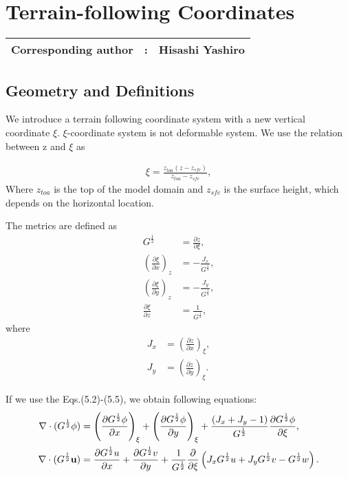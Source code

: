 \chapter{Terrain-following Coordinates}
\label{chap:terrain-following}
{\bf \Large 
\begin{tabular}{ccc}
\hline
  Corresponding author & : & Hisashi Yashiro\\
\hline
\end{tabular}
}

\section{Geometry and Definitions}
We introduce a terrain following coordinate system with a new vertical coordinate $\xi$. 
$\xi$-coordinate system is not deformable system. We use the relation between z and $\xi$ as

\begin{eqnarray}
 \xi = \frac{z_{toa}(z-z_{sfc})}{z_{toa}-z_{sfc}},
\end{eqnarray}
Where $z_{toa}$ is the top of the model domain and $z_{sfc}$ is the surface height, 
which depends on the horizontal location.

The metrics are defined as
\begin{align}
 G^{\frac{1}{2}} &= \frac{\partial z}{\partial \xi}, \\
 \left(\frac{\partial \xi}{\partial x}\right)_{z} &= -\frac{J_{x}}{G^{\frac{1}{2}}},\\
 \left(\frac{\partial \xi}{\partial y}\right)_{z} &= -\frac{J_{y}}{G^{\frac{1}{2}}},\\
       \frac{\partial \xi}{\partial z}            &=  \frac{1}{G^{\frac{1}{2}}},
\end{align}
where
\begin{align}
 J_{x} &= \left(\frac{\partial z}{\partial x}\right)_{\xi},\\
 J_{y} &= \left(\frac{\partial z}{\partial y}\right)_{\xi}.
\end{align}

If we use the Eqs.(5.2)-(5.5), we obtain following equations:
\begin{align}
 \nabla \cdot (G^{\frac{1}{2}} \phi) &= \left(\frac{\partial G^{\frac{1}{2}} \phi}{\partial x}\right)_{\xi}
                                      + \left(\frac{\partial G^{\frac{1}{2}} \phi}{\partial y}\right)_{\xi}
                                      + \frac{(J_{x}+J_{y}-1)}{G^{\frac{1}{2}}} \frac{\partial G^{\frac{1}{2}} \phi}{\partial \xi}, \\
 \nabla \cdot (G^{\frac{1}{2}} \bf u) &= \frac{\partial G^{\frac{1}{2}} u}{\partial x}
                                       + \frac{\partial G^{\frac{1}{2}} v}{\partial y}
                                       + \frac{1}{G^{\frac{1}{2}}} \frac{\partial}{\partial \xi}
                                         \left(J_{x} {G^{\frac{1}{2}}} u+J_{y} {G^{\frac{1}{2}}} v - {G^{\frac{1}{2}}} w\right).
\end{align}

